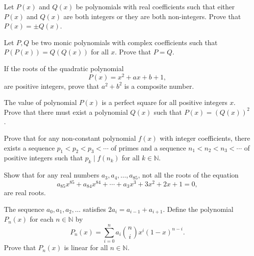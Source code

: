 \documentclass[12pt,a4paper]{memoir}
\theoremstyle{definition}
\begin{document}
\begin{question}
	Let $P(x)$ and $Q(x)$ be polynomials with real coefficients such that either $P(x)$ and $Q(x)$ are both integers or they are both non-integers. Prove that $P(x) = \pm Q(x)$.
\end{question}


\begin{question}[name={2000 Romania TST}]
	Let $P,Q$ be two monic polynomials with complex coefficients such that $P(P(x))=Q(Q(x))$ for all $x$. Prove that $P=Q$.
\end{question}

\begin{question}[name={1986 USSR}]
	If the roots of the quadratic polynomial \[P(x)=x^2+ax+b+1,\] are positive integers, prove that $a^2+b^2$ is a composite number.
\end{question}


\begin{question}
	The value of polynomial $P(x)$ is a perfect square for all positive integers $x$. Prove that there must exist a polynomial $Q(x)$ such that $P(x)=(Q(x))^2$.
\end{question}


\begin{question}[name={1998 Iran}]
	Prove that for any non-constant polynomial $f(x)$ with integer coefficients, there exists a sequence $p_1<p_2<p_3<\cdots$ of primes and a sequence $n_1<n_2<n_3<\cdots$ of positive integers such that $p_k \mid f(n_k)$ for all $k \in \mathbb N$.
\end{question}


\begin{question}[name={1996 Taiwan}]
	Show that for any real numbers $a_{3},a_{4},\dots,a_{85}$, not all the roots of the equation 
	\[a_{85}x^{85}+a_{84}x^{84}+\cdots+a_{3}x^{3}+3x^{2}+2x+1=0,\] are real roots.
\end{question}



\begin{question}[name={1998 Iran}]
	The sequence $a_0,a_1,a_2,\dots$ satisfies $2a_i = a_{i-1} + a_{i+1}$. Define the polynomial $P_n(x)$ for each $n\in\mathbb N$ by
	\[P_n(x) = \sum_{i=0}^n a_i \binom{n}{i} x^i (1-x)^{n-i}.\]
	Prove that $P_n(x)$ is linear for all $n\in \mathbb N$.
\end{question}
\end{document}

